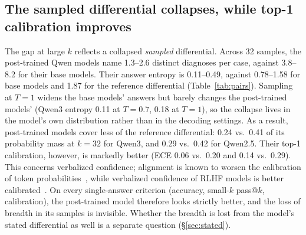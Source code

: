 \documentclass[11pt]{article}
\begin{document}
\subsection{The sampled differential collapses, while top-1 calibration improves}\label{sec:collapse}
The gap at large $k$ reflects a collapsed \emph{sampled} differential.
Across 32 samples, the post-trained Qwen models name 1.3--2.6 distinct diagnoses per case, against 3.8--8.2 for their base models.
Their answer entropy is 0.11--0.49, against 0.78--1.58 for base models and 1.87 for the reference differential (Table~\ref{tab:pairs}).
Sampling at $T{=}1$ widens the base models' answers but barely changes the post-trained models' (Qwen3 entropy 0.11 at $T{=}0.7$, 0.18 at $T{=}1$), so the collapse lives in the model's own distribution rather than in the decoding settings.
As a result, post-trained models cover less of the reference differential: 0.24 vs.\ 0.41 of its probability mass at $k{=}32$ for Qwen3, and 0.29 vs.\ 0.42 for Qwen2.5.
Their top-1 calibration, however, is markedly better (ECE 0.06 vs.\ 0.20 and 0.14 vs.\ 0.29). This concerns verbalized confidence; alignment is known to worsen the calibration of token probabilities~\citep{openai2023gpt4,zhu2023calibration}, while verbalized confidence of RLHF models is better calibrated~\citep{tian2023justask}.
On every single-answer criterion (accuracy, small-$k$ pass@$k$, calibration), the post-trained model therefore looks strictly better, and the loss of breadth in its samples is invisible. Whether the breadth is lost from the model's stated differential as well is a separate question (\S\ref{sec:stated}).
\end{document}
